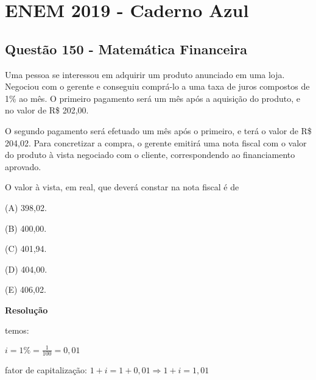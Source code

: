 \chapter{ENEM 2019 - Caderno Azul}

\section{Questão 150 - Matemática Financeira}

Uma pessoa se interessou em adquirir um produto anunciado em uma loja. Negociou com o gerente e conseguiu comprá-lo a uma taxa de juros compostos de 1\% ao mês. O primeiro pagamento será um mês após a aquisição do produto, e no valor de R\$ 202,00.

O segundo pagamento será efetuado um mês após o primeiro, e terá o valor de R\$ 204,02. Para concretizar a compra, o gerente emitirá uma nota fiscal com o valor do produto à vista negociado com o cliente, correspondendo ao financiamento aprovado.

O valor à vista, em real, que deverá constar na nota fiscal é de

(A) 398,02.

(B) 400,00.

(C) 401,94.

(D) 404,00.

(E) 406,02.

\textbf{Resolução}

temos: 

$ i = 1\% = \frac{1}{100} = 0,01 $

fator de capitalização: $ 1 + i = 1 + 0,01 \Longrightarrow 1 + i = 1,01 $

